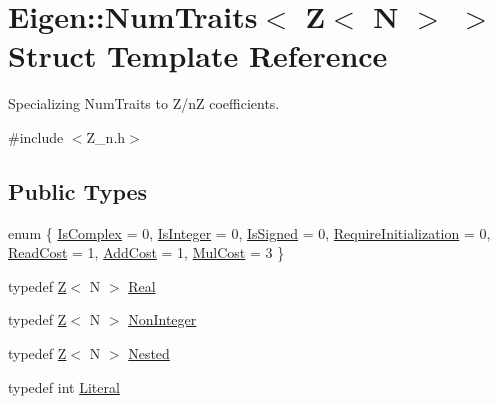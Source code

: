 \hypertarget{structEigen_1_1NumTraits_3_01Z_3_01N_01_4_01_4}{}\section{Eigen\+:\+:Num\+Traits$<$ Z$<$ N $>$ $>$ Struct Template Reference}
\label{structEigen_1_1NumTraits_3_01Z_3_01N_01_4_01_4}


Specializing Num\+Traits to Z/nZ coefficients.  




{\ttfamily \#include $<$Z\+\_\+n.\+h$>$}

\subsection*{Public Types}
\begin{DoxyCompactItemize}
\item 
enum \{ \newline
\hyperlink{structEigen_1_1NumTraits_3_01Z_3_01N_01_4_01_4_a1d8939bd585b60ec61e806fc7746335ea6c8eb445b3a7229e39f17d7ecfb436c1}{Is\+Complex} = 0, 
\hyperlink{structEigen_1_1NumTraits_3_01Z_3_01N_01_4_01_4_a1d8939bd585b60ec61e806fc7746335eafe6aa532bc302c25acc075710bdae324}{Is\+Integer} = 0, 
\hyperlink{structEigen_1_1NumTraits_3_01Z_3_01N_01_4_01_4_a1d8939bd585b60ec61e806fc7746335ea3fd4b1528c990c1fb32745a57e5034d6}{Is\+Signed} = 0, 
\hyperlink{structEigen_1_1NumTraits_3_01Z_3_01N_01_4_01_4_a1d8939bd585b60ec61e806fc7746335ead6dcd36369e8ba30de5940b21c1eeebd}{Require\+Initialization} = 0, 
\newline
\hyperlink{structEigen_1_1NumTraits_3_01Z_3_01N_01_4_01_4_a1d8939bd585b60ec61e806fc7746335eacbe8b935f47659896bbfe63e5575620e}{Read\+Cost} = 1, 
\hyperlink{structEigen_1_1NumTraits_3_01Z_3_01N_01_4_01_4_a1d8939bd585b60ec61e806fc7746335ea24b9a1fdb58e87d846d5fd17ca7b2573}{Add\+Cost} = 1, 
\hyperlink{structEigen_1_1NumTraits_3_01Z_3_01N_01_4_01_4_a1d8939bd585b60ec61e806fc7746335eadca4b4458ad099a4cf655c4f8c430f6e}{Mul\+Cost} = 3
 \}
\item 
typedef \hyperlink{classZ}{Z}$<$ N $>$ \hyperlink{structEigen_1_1NumTraits_3_01Z_3_01N_01_4_01_4_a44847690171e3535ea893e5d3742d5dc}{Real}
\item 
typedef \hyperlink{classZ}{Z}$<$ N $>$ \hyperlink{structEigen_1_1NumTraits_3_01Z_3_01N_01_4_01_4_a54a7b88f9d282c613909ac128476d3d1}{Non\+Integer}
\item 
typedef \hyperlink{classZ}{Z}$<$ N $>$ \hyperlink{structEigen_1_1NumTraits_3_01Z_3_01N_01_4_01_4_aadda945d9b822d2c43cddd141d895ab5}{Nested}
\item 
typedef int \hyperlink{structEigen_1_1NumTraits_3_01Z_3_01N_01_4_01_4_afc07a3fc65ced03bfc30de81355ac988}{Literal}
\end{DoxyCompactItemize}
